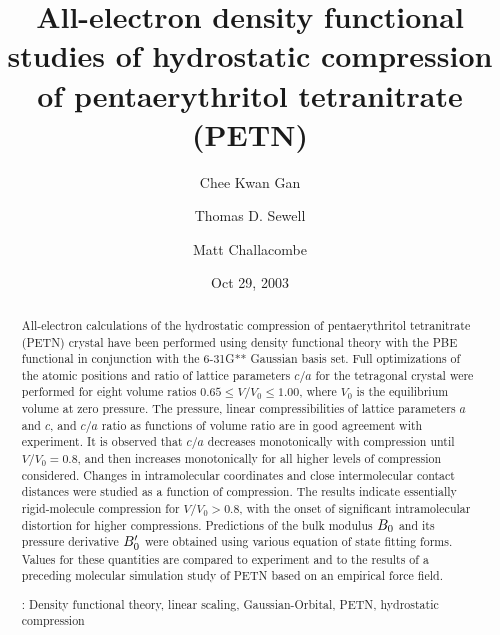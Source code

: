 \documentclass[prb,aps,nobibnotes,twocolumn,doublespace,twocolumngrid,superbib]{revtex4}
\begin{document}
\title[Short Title]{ 
All-electron density functional studies of hydrostatic compression of 
pentaerythritol tetranitrate (PETN)}
\author{Chee Kwan Gan\footnotemark[1]}
\author{Thomas D. Sewell\footnotemark[2]}
\author{Matt Challacombe\footnotemark[3]}

\date{Oct 29, 2003}

\begin{abstract}
All-electron calculations of the hydrostatic compression of
pentaerythritol tetranitrate (PETN) crystal have been performed using
density functional theory with the PBE functional in conjunction with
the 6-31G** Gaussian basis set.  Full optimizations of the atomic
positions and ratio of lattice parameters $c/a$ for the tetragonal
crystal were performed for eight volume ratios $0.65
\le V/V_0 \le 1.00$, where $V_0$ is the equilibrium volume at zero
pressure.  The pressure, linear compressibilities of lattice
parameters $a$ and $c$, and $c/a$ ratio as functions of volume ratio
are in good agreement with experiment.  It is observed that
$c/a$ decreases monotonically with compression until $V/V_0=0.8$, 
and then increases monotonically for all higher levels of compression
considered.  Changes in intramolecular coordinates
and close intermolecular contact distances were studied as a function
of compression.  The results indicate essentially rigid-molecule compression
for $V/V_0 >0.8$, with the onset of significant intramolecular distortion
for higher compressions.  Predictions of the bulk modulus $B_0$ and its 
pressure derivative ${B'_0}$ were obtained using various equation of 
state fitting forms. Values for these quantities are compared to 
experiment and to the results of a preceding molecular simulation study 
of PETN based on an empirical force field.

\smallskip
{}: Density functional theory, linear scaling, 
Gaussian-Orbital, PETN, hydrostatic compression
\end{abstract}

\maketitle

\end{document}
